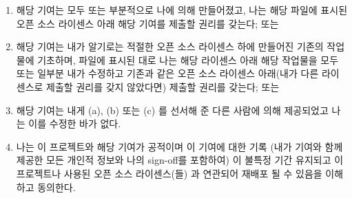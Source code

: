 \begin{enumerate}[label={(\alph*)}]
\item	해당 기여는 모두 또는 부분적으로 나에 의해 만들어졌고, 나는 해당 파일에
	표시된 오픈 소스 라이센스 아래 해당 기여를 제출할 권리를 갖는다; 또는

\iffalse
\item	The contribution was created in whole or in part
	by me and I have the right to submit it under
	the open source license indicated in the file; or
\fi

\item	해당 기여는 내가 알기로는 적절한 오픈 소스 라이센스 하에 만들어진
	기존의 작업물에 기초하며, 파일에 표시된 대로 나는 해당 라이센스 아래
	해당 작업물을 모두 또는 일부분 내가 수정하고 기존과 같은 오픈 소스
	라이센스 아래(내가 다른 라이센스로 제출할 권리를 갖지 않았다면) 제출할
	권리를 갖는다; 또는
\iffalse

\item	The contribution is based upon previous work
	that, to the best of my knowledge, is covered
	under an appropriate open source License and I
	have the right under that license to submit that
	work with modifications, whether created in whole
	or in part by me, under the same open source
	license (unless I am permitted to submit under
	a different license), as indicated in the file; or
\fi

\item	해당 기여는 내게 (a), (b) 또는 (c) 를 선서해 준 다른 사람에 의해
	제공되었고 나는 이를 수정한 바가 없다.

\iffalse
\item	The contribution was provided directly to me by
	some other person who certified (a), (b) or (c)
	and I have not modified it.
\fi

\item	나는 이 프로젝트와 해당 기여가 공적이며 이 기여에 대한 기록 (내가
	기여와 함께 제공한 모든 개인적 정보와 나의 sign-off를 포함하여) 이
	불특정 기간 유지되고 이 프로젝트나 사용된 오픈 소스 라이센스(들) 과
	연관되어 재배포 될 수 있음을 이해하고 동의한다.
\iffalse

\item	I understand and agree that this project and the
	contribution are public and that a record of the
	contribution (including all personal information
	I submit with it, including my sign-off) is
	maintained indefinitely and may be redistributed
	consistent with this project or the open source
	license(s) involved.
\fi
\end{enumerate}

